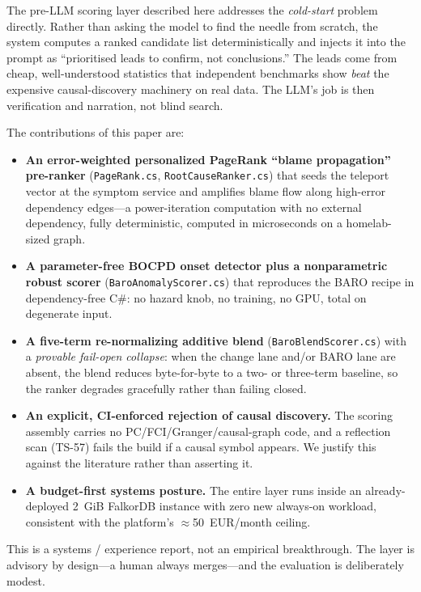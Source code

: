 \documentclass[11pt]{article}
\begin{document}
The pre-LLM scoring layer described here addresses the \emph{cold-start} problem
directly. Rather than asking the model to find the needle from scratch, the system
computes a ranked candidate list deterministically and injects it into the prompt
as ``prioritised leads to confirm, not conclusions.'' The leads come from cheap,
well-understood statistics that independent benchmarks show \emph{beat} the
expensive causal-discovery machinery on real data. The LLM's job is then
verification and narration, not blind search.

The contributions of this paper are:

\begin{itemize}
  \item \textbf{An error-weighted personalized PageRank ``blame propagation''
    pre-ranker} (\texttt{PageRank.cs}, \texttt{RootCauseRanker.cs}) that seeds the
    teleport vector at the symptom service and amplifies blame flow along
    high-error dependency edges---a power-iteration computation with no external
    dependency, fully deterministic, computed in microseconds on a
    homelab-sized graph.
  \item \textbf{A parameter-free BOCPD onset detector plus a nonparametric robust
    scorer} (\texttt{BaroAnomalyScorer.cs}) that reproduces the BARO recipe in
    dependency-free C\#: no hazard knob, no training, no GPU, total on degenerate
    input.
  \item \textbf{A five-term re-normalizing additive blend}
    (\texttt{BaroBlendScorer.cs}) with a \emph{provable fail-open collapse}: when
    the change lane and/or BARO lane are absent, the blend reduces byte-for-byte
    to a two- or three-term baseline, so the ranker degrades gracefully rather
    than failing closed.
  \item \textbf{An explicit, CI-enforced rejection of causal discovery.} The
    scoring assembly carries no PC/FCI/Granger/causal-graph code, and a reflection
    scan (TS-57) fails the build if a causal symbol appears. We justify this
    against the literature rather than asserting it.
  \item \textbf{A budget-first systems posture.} The entire layer runs inside an
    already-deployed 2~GiB FalkorDB instance with zero new always-on workload,
    consistent with the platform's $\approx$50~EUR/month ceiling.
\end{itemize}

This is a systems / experience report, not an empirical breakthrough. The layer
is advisory by design---a human always merges---and the evaluation is
deliberately modest.
\end{document}
